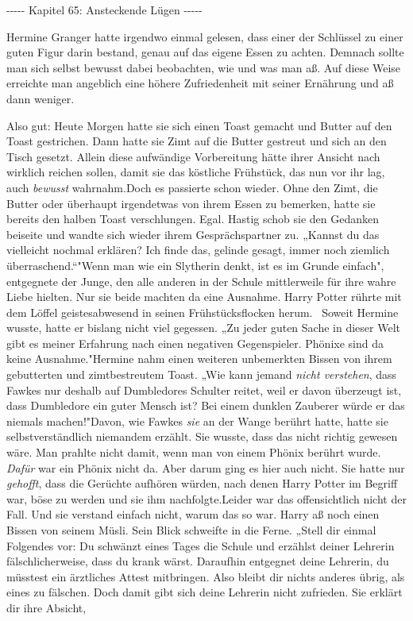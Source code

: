 

\hypertarget{ansteckende-luxfcgen}{%

-\/-\/-\/-\/- Kapitel 65: Ansteckende Lügen -\/-\/-\/-\/-

Hermine Granger hatte irgendwo einmal gelesen, dass einer der Schlüssel zu einer guten Figur darin bestand, genau auf das eigene Essen zu achten. Demnach sollte man sich selbst bewusst dabei beobachten, wie und was man aß. Auf diese Weise erreichte man angeblich eine höhere Zufriedenheit mit seiner Ernährung und aß dann weniger.

Also gut: Heute Morgen hatte sie sich einen Toast gemacht und Butter auf den Toast gestrichen. Dann hatte sie Zimt auf die Butter gestreut und sich an den Tisch gesetzt. Allein diese aufwändige Vorbereitung hätte ihrer Ansicht nach wirklich reichen sollen, damit sie das köstliche Frühstück, das nun vor ihr lag, auch \emph{bewusst} wahrnahm.Doch es passierte schon wieder. Ohne den Zimt, die Butter oder überhaupt irgendetwas von ihrem Essen zu bemerken, hatte sie bereits den halben Toast verschlungen. Egal. Hastig schob sie den Gedanken beiseite und wandte sich wieder ihrem Gesprächspartner zu. „Kannst du das vielleicht nochmal erklären? Ich finde das, gelinde gesagt, immer noch ziemlich überraschend.“"Wenn man wie ein Slytherin denkt, ist es im Grunde einfach", entgegnete der Junge, den alle anderen in der Schule mittlerweile für ihre wahre Liebe hielten. Nur sie beide machten da eine Ausnahme. Harry Potter rührte mit dem Löffel geistesabwesend in seinen Frühstücksflocken herum. ~Soweit Hermine wusste, hatte er bislang nicht viel gegessen. „Zu jeder guten Sache in dieser Welt gibt es meiner Erfahrung nach einen negativen Gegenspieler. Phönixe sind da keine Ausnahme."Hermine nahm einen weiteren unbemerkten Bissen von ihrem gebutterten und zimtbestreutem Toast. „Wie kann jemand \emph{nicht verstehen}, dass Fawkes nur deshalb auf Dumbledores Schulter reitet, weil er davon überzeugt ist, dass Dumbledore ein guter Mensch ist? Bei einem dunklen Zauberer würde er das niemals machen!"Davon, wie Fawkes \emph{sie} an der Wange berührt hatte, hatte sie selbstverständlich niemandem erzählt. Sie wusste, dass das nicht richtig gewesen wäre. Man prahlte nicht damit, wenn man von einem Phönix berührt wurde. \emph{Dafür} war ein Phönix nicht da. Aber darum ging es hier auch nicht. Sie hatte nur \emph{gehofft}, dass die Gerüchte aufhören würden, nach denen Harry Potter im Begriff war, böse zu werden und sie ihm nachfolgte.Leider war das offensichtlich nicht der Fall. Und sie verstand einfach nicht, warum das so war. Harry aß noch einen Bissen von seinem Müsli. Sein Blick schweifte in die Ferne. „Stell dir einmal Folgendes vor: Du schwänzt eines Tages die Schule und erzählst deiner Lehrerin fälschlicherweise, dass du krank wärst. Daraufhin entgegnet deine Lehrerin, du müsstest ein ärztliches Attest mitbringen. Also bleibt dir nichts anderes übrig, als eines zu fälschen. Doch damit gibt sich deine Lehrerin nicht zufrieden. Sie erklärt dir ihre Absicht, }
